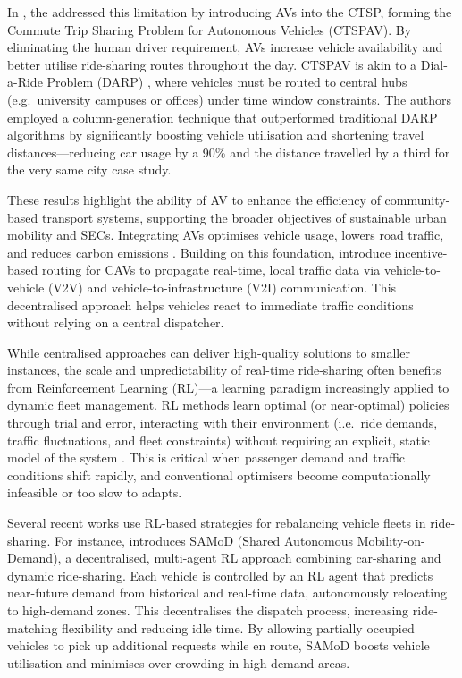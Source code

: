 In \cite{hasan2020benefits}, the addressed this limitation by introducing AVs into the CTSP, forming the Commute Trip Sharing Problem for Autonomous Vehicles (CTSPAV). By eliminating the human driver requirement, AVs increase vehicle availability and better utilise ride-sharing routes throughout the day. CTSPAV is akin to a Dial-a-Ride Problem (DARP) \cite{ho2018survey}, where vehicles must be routed to central hubs (e.g.\ university campuses or offices) under time window constraints. The authors employed a column-generation technique that outperformed traditional DARP algorithms by significantly boosting vehicle utilisation and shortening travel distances—reducing car usage by a 90\% and the distance travelled by a third for the very same city case study.

These results highlight the ability of AV to enhance the efficiency of community-based transport systems, supporting the broader objectives of sustainable urban mobility and SECs. Integrating AVs optimises vehicle usage, lowers road traffic, and reduces carbon emissions \cite{hasan2020benefits}. Building on this foundation, \cite{wang2021incentive,bakibillah2021incentive} introduce incentive-based routing for CAVs to propagate real-time, local traffic data via vehicle-to-vehicle (V2V) and vehicle-to-infrastructure (V2I) communication. This decentralised approach helps vehicles react to immediate traffic conditions without relying on a central dispatcher.

While centralised approaches can deliver high-quality solutions to smaller instances, the scale and unpredictability of real-time ride-sharing often benefits from Reinforcement Learning (RL)—a learning paradigm increasingly applied to dynamic fleet management. RL methods learn optimal (or near-optimal) policies through trial and error, interacting with their environment (i.e.\ ride demands, traffic fluctuations, and fleet constraints) without requiring an explicit, static model of the system \cite{bakibillah2021incentive, amaraouali2021review}. This is critical when passenger demand and traffic conditions shift rapidly, and conventional optimisers become computationally infeasible or too slow to adapts.

Several recent works use RL-based strategies for rebalancing vehicle fleets in ride-sharing. For instance, \cite{Reference1} introduces SAMoD (Shared Autonomous Mobility-on-Demand), a decentralised, multi-agent RL approach combining car-sharing and dynamic ride-sharing. Each vehicle is controlled by an RL agent that predicts near-future demand from historical and real-time data, autonomously relocating to high-demand zones. This decentralises the dispatch process, increasing ride-matching flexibility and reducing idle time. By allowing partially occupied vehicles to pick up additional requests while en route, SAMoD boosts vehicle utilisation and minimises over-crowding in high-demand areas.

